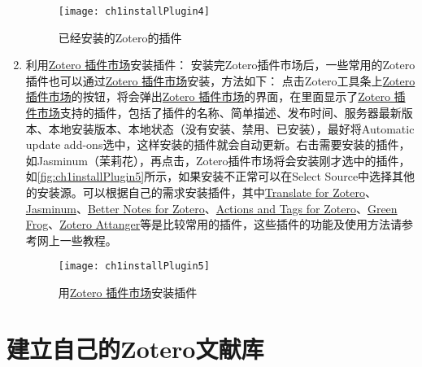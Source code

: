 \documentclass[theorem=false,mathfont=none,openany,sub3section]{easybook}
\begin{document}
\begin{enumerate}
	\begin{figure}[htbp]
		\centering
		\texttt{[image: ch1installPlugin4]}
		\caption{已经安装的Zotero的插件}
		\label{fig:ch1installPlugin4}
	\end{figure}
	
	\item 利用\href{https://github.com/syt2/zotero-addons}{Zotero 插件市场}安装插件：
	安装完Zotero插件市场后，一些常用的Zotero插件也可以通过\href{https://github.com/syt2/zotero-addons}{Zotero 插件市场}安装，方法如下：
	点击Zotero工具条上\href{https://github.com/syt2/zotero-addons}{Zotero 插件市场}的按钮，将会弹出\href{https://github.com/syt2/zotero-addons}{Zotero 插件市场}的界面，在里面显示了\href{https://github.com/syt2/zotero-addons}{Zotero 插件市场}支持的插件，包括了插件的名称、简单描述、发布时间、服务器最新版本、本地安装版本、本地状态（没有安装、禁用、已安装），最好将Automatic update add-ons选中，这样安装的插件就会自动更新。右击需要安装的插件，如Jasminum（茉莉花），再点击，Zotero插件市场将会安装刚才选中的插件，如\autoref{fig:ch1installPlugin5}所示，如果安装不正常可以在Select Source中选择其他的安装源。可以根据自己的需求安装插件，其中\href{https://github.com/windingwind/zotero-pdf-translate}{Translate for Zotero}、\href{https://github.com/l0o0/jasminum}{Jasminum}、\href{https://github.com/windingwind/zotero-better-notes}{Better Notes for Zotero}、\href{https://github.com/windingwind/zotero-actions-tags}{Actions and Tags for Zotero}、\href{https://github.com/redleafnew/zotero-updateifsE}{Green Frog}、\href{https://github.com/MuiseDestiny/zotero-attanger}{Zotero Attanger}等是比较常用的插件，这些插件的功能及使用方法请参考网上一些教程。
 
	\begin{figure}[htbp]
		\centering
		\texttt{[image: ch1installPlugin5]}
		\caption{用\href{https://github.com/syt2/zotero-addons}{Zotero 插件市场}安装插件}
		\label{fig:ch1installPlugin5}
	\end{figure}
 	
\end{enumerate}


\section{建立自己的Zotero文献库}\label{sec:newLibrary}
\end{document}
